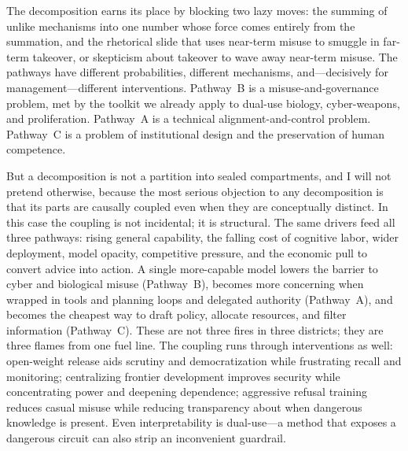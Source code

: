 \documentclass[11pt]{article}
\begin{document}
The decomposition earns its place by blocking two lazy moves: the summing of unlike mechanisms into one number whose force comes entirely from the summation, and the rhetorical slide that uses near-term misuse to smuggle in far-term takeover, or skepticism about takeover to wave away near-term misuse. The pathways have different probabilities, different mechanisms, and---decisively for management---different interventions. Pathway~B is a misuse-and-governance problem, met by the toolkit we already apply to dual-use biology, cyber-weapons, and proliferation. Pathway~A is a technical alignment-and-control problem. Pathway~C is a problem of institutional design and the preservation of human competence.

But a decomposition is not a partition into sealed compartments, and I will not pretend otherwise, because the most serious objection to any decomposition is that its parts are causally coupled even when they are conceptually distinct. In this case the coupling is not incidental; it is structural. The same drivers feed all three pathways: rising general capability, the falling cost of cognitive labor, wider deployment, model opacity, competitive pressure, and the economic pull to convert advice into action. A single more-capable model lowers the barrier to cyber and biological misuse (Pathway~B), becomes more concerning when wrapped in tools and planning loops and delegated authority (Pathway~A), and becomes the cheapest way to draft policy, allocate resources, and filter information (Pathway~C). These are not three fires in three districts; they are three flames from one fuel line. The coupling runs through interventions as well: open-weight release aids scrutiny and democratization while frustrating recall and monitoring; centralizing frontier development improves security while concentrating power and deepening dependence; aggressive refusal training reduces casual misuse while reducing transparency about when dangerous knowledge is present. Even interpretability is dual-use---a method that exposes a dangerous circuit can also strip an inconvenient guardrail.
\end{document}
